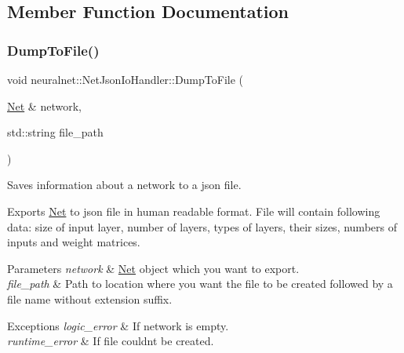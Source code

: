 \subsection{Member Function Documentation}
\mbox{\label{classneuralnet_1_1NetJsonIoHandler_a0e8c0b44b686498867ce83835d5811c2}} 
\subsubsection{\texorpdfstring{Dump\+To\+File()}{DumpToFile()}}
{\footnotesize\ttfamily void neuralnet\+::\+Net\+Json\+Io\+Handler\+::\+Dump\+To\+File (\begin{DoxyParamCaption}\item[{\hyperlink{classneuralnet_1_1Net}{Net} \&}]{network,  }\item[{std\+::string}]{file\+\_\+path }\end{DoxyParamCaption})\hspace{0.3cm}{\ttfamily [virtual]}}



Saves information about a network to a json file. 

Exports \hyperlink{classneuralnet_1_1Net}{Net} to json file in human readable format. File will contain following data\+: size of input layer, number of layers, types of layers, their sizes, numbers of inputs and weight matrices.


\begin{DoxyParams}{Parameters}
{\em network} & \hyperlink{classneuralnet_1_1Net}{Net} object which you want to export. \\
\hline
{\em file\+\_\+path} & Path to location where you want the file to be created followed by a file name without extension suffix. \\
\hline
\end{DoxyParams}

\begin{DoxyExceptions}{Exceptions}
{\em logic\+\_\+error} & If network is empty. \\
\hline
{\em runtime\+\_\+error} & If file couldn\textquotesingle{}t be created. \\
\hline
\end{DoxyExceptions}


